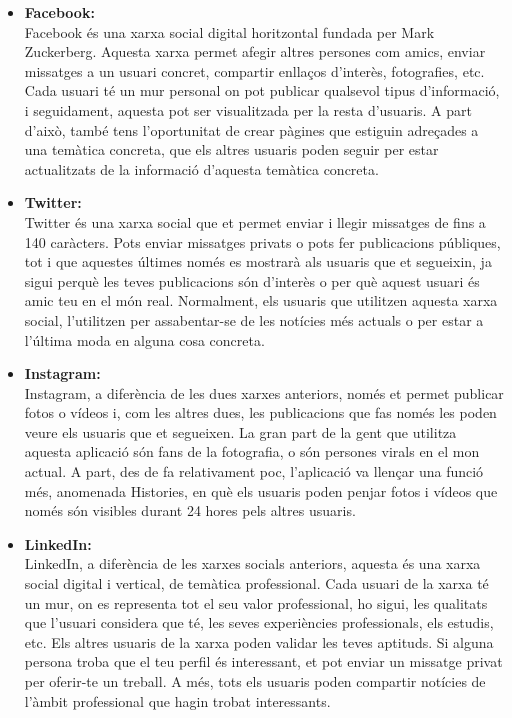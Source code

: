 \documentclass[11pt,catalan,listoffigures,listoftables]{tfgetsinf}
\begin{document}
\begin{itemize}
	\item \textbf{Facebook:} \\Facebook és una xarxa social digital horitzontal fundada per Mark Zuckerberg. Aquesta xarxa permet afegir altres persones com amics, enviar missatges a un usuari concret, compartir enllaços d’interès, fotografies, etc. Cada usuari té un mur personal on pot publicar qualsevol tipus d’informació, i seguidament, aquesta pot ser visualitzada per la resta d’usuaris. A part d’això, també tens l’oportunitat de crear pàgines que estiguin adreçades a una temàtica concreta, que els altres usuaris poden seguir per estar actualitzats de la informació d’aquesta temàtica concreta.
	\item \textbf{Twitter:} \\Twitter és una xarxa social que et permet enviar i llegir missatges de fins a 140 caràcters. Pots enviar missatges privats o pots fer publicacions públiques, tot i que aquestes últimes només es mostrarà als usuaris que et segueixin, ja sigui perquè les teves publicacions són d’interès o per què aquest usuari és amic teu en el món real. Normalment, els usuaris que utilitzen aquesta xarxa social, l’utilitzen per assabentar-se de les notícies més actuals o per estar a l’última moda en alguna cosa concreta.
	\item \textbf{Instagram:} \\Instagram, a diferència de les dues xarxes anteriors, només et permet publicar fotos o vídeos i, com les altres dues, les publicacions que fas només les poden veure els usuaris que et segueixen. La gran part de la gent que utilitza aquesta aplicació són fans de la fotografia, o són persones virals en el mon actual. A part, des de fa relativament poc, l’aplicació va llençar una funció més, anomenada Histories, en què els usuaris poden penjar fotos i vídeos que només són visibles durant 24 hores pels altres usuaris.
	\item \textbf{LinkedIn:} \\LinkedIn, a diferència de les xarxes socials anteriors, aquesta és una xarxa social digital i vertical, de temàtica professional. Cada usuari de la xarxa té un mur, on es representa tot el seu valor professional, ho sigui, les qualitats que l’usuari considera que té, les seves experiències professionals, els estudis, etc. Els altres usuaris de la xarxa poden validar les teves aptituds. Si alguna persona troba que el teu perfil és interessant, et pot enviar un missatge privat per oferir-te un treball. A més, tots els usuaris poden compartir notícies de l’àmbit professional que hagin trobat interessants. 
\end{itemize} 
\end{document}
